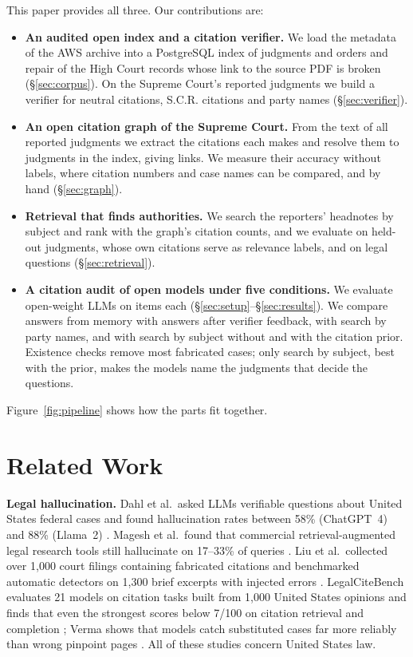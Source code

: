\documentclass[conference]{IEEEtran}
\begin{document}
This paper provides all three. Our contributions are:
\begin{itemize}
\item \textbf{An audited open index and a citation verifier.} We load the metadata of the AWS archive into a PostgreSQL index of \CorpusTotal{} judgments and orders and repair \MobileLinkedPct{} of the \MobileTotal{} High Court records whose link to the source PDF is broken (\S\ref{sec:corpus}). On the Supreme Court's \CorpusSC{} reported judgments we build a verifier for neutral citations, S.C.R. citations and party names (\S\ref{sec:verifier}).
\item \textbf{An open citation graph of the Supreme Court.} From the text of all \GraphTextOK{} reported judgments we extract the citations each makes and resolve them to judgments in the index, giving \GraphEdges{} links. We measure their accuracy without labels, where citation numbers and case names can be compared, and by hand (\S\ref{sec:graph}).
\item \textbf{Retrieval that finds authorities.} We search the reporters' headnotes by subject and rank with the graph's citation counts, and we evaluate on \RecNTest{} held-out judgments, whose own citations serve as relevance labels, and on \NumTopics{} legal questions (\S\ref{sec:retrieval}).
\item \textbf{A citation audit of open models under five conditions.} We evaluate \NumModels{} open-weight LLMs on \NumItems{} items each (\S\ref{sec:setup}--\S\ref{sec:results}). We compare answers from memory with answers after verifier feedback, with search by party names, and with search by subject without and with the citation prior. Existence checks remove most fabricated cases; only search by subject, best with the prior, makes the models name the judgments that decide the questions.
\end{itemize}
Figure~\ref{fig:pipeline} shows how the parts fit together.



\section{Related Work}
\label{sec:related}
\textbf{Legal hallucination.} Dahl et al.\ asked LLMs verifiable questions about United States federal cases and found hallucination rates between 58\% (ChatGPT~4) and 88\% (Llama~2) \cite{dahl2024}. Magesh et al.\ found that commercial retrieval-augmented legal research tools still hallucinate on 17--33\% of queries \cite{magesh2025}. Liu et al.\ collected over 1{,}000 court filings containing fabricated citations and benchmarked automatic detectors on 1{,}300 brief excerpts with injected errors \cite{liu2026checks}. LegalCiteBench evaluates 21 models on citation tasks built from 1{,}000 United States opinions and finds that even the strongest scores below 7/100 on citation retrieval and completion \cite{legalcitebench}; Verma shows that models catch substituted cases far more reliably than wrong pinpoint pages \cite{verma2026}. All of these studies concern United States law.
\end{document}
